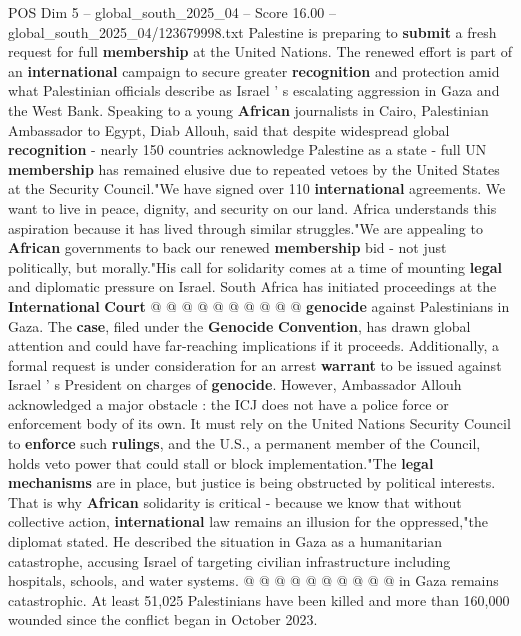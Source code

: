 \begin{textsample}{POS Dim 5 – global\_south\_2025\_04 – Score 16.00 – global\_south\_2025\_04/123679998.txt}  \label{ex:f5_pos_088}
Palestine is preparing to \textbf{submit} a fresh request for full \textbf{membership} at the United Nations.
The renewed effort is part of an \textbf{international} campaign to secure greater \textbf{recognition} and protection amid what Palestinian officials describe as Israel ' s escalating aggression in Gaza and the West Bank.
Speaking to a young \textbf{African} journalists in Cairo, Palestinian Ambassador to Egypt, Diab Allouh, said that despite widespread global \textbf{recognition} - nearly 150 countries acknowledge Palestine as a state - full UN \textbf{membership} has remained elusive due to repeated vetoes by the United States at the Security Council."We have signed over 110 \textbf{international} agreements.
We want to live in peace, dignity, and security on our land.
Africa understands this aspiration because it has lived through similar struggles."We are appealing to \textbf{African} governments to back our renewed \textbf{membership} bid - not just politically, but morally."His call for solidarity comes at a time of mounting \textbf{legal} and diplomatic pressure on Israel.
South Africa has initiated proceedings at the \textbf{International} \textbf{Court} @ @ @ @ @ @ @ @ @ @ \textbf{genocide} against Palestinians in Gaza.
The \textbf{case}, filed under the \textbf{Genocide} \textbf{Convention}, has drawn global attention and could have far-reaching implications if it proceeds.
Additionally, a formal request is under consideration for an arrest \textbf{warrant} to be issued against Israel ' s President on charges of \textbf{genocide}.
However, Ambassador Allouh acknowledged a major obstacle : the ICJ does not have a police force or enforcement body of its own.
It must rely on the United Nations Security Council to \textbf{enforce} such \textbf{rulings}, and the U.S., a permanent member of the Council, holds veto power that could stall or block implementation."The \textbf{legal} \textbf{mechanisms} are in place, but justice is being obstructed by political interests.
That is why \textbf{African} solidarity is critical - because we know that without collective action, \textbf{international} law remains an illusion for the oppressed,"the diplomat stated.
He described the situation in Gaza as a humanitarian catastrophe, accusing Israel of targeting civilian infrastructure including hospitals, schools, and water systems. @ @ @ @ @ @ @ @ @ @ in Gaza remains catastrophic.
At least 51,025 Palestinians have been killed and more than 160,000 wounded since the conflict began in October 2023.

\end{textsample}
